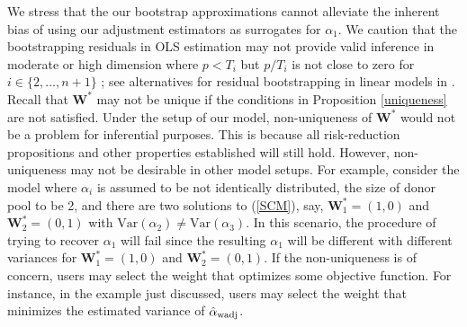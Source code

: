 \documentclass[11pt]{article}
\def\mc#1{\mathcal{#1}} %
\DeclareMathOperator*{\argmax}{arg\,max} %
\def\var#1{\mathrm{Var}(#1)} %
\theoremstyle{definition}
\begin{document}


We stress that the our bootstrap approximations cannot alleviate the inherent bias of using our adjustment estimators as surrogates for $\alpha_1$. We caution that the bootstrapping residuals in OLS estimation may not provide valid inference in moderate or high dimension where $p < T_i$ but $p / T_i$ is not close to zero for $i\in \{2, \ldots, n+1\}$ \citep{el2018can}; see alternatives for residual bootstrapping in linear models in \citet{el2018can}. Recall that $\mathbf{W}^*$  may not be unique if the conditions in Proposition \ref{uniqueness} are not satisfied. Under the setup of our model, non-uniqueness of $\mathbf{W}^*$ would not be a problem for inferential purposes. This is because all risk-reduction propositions and other properties established will still hold. However, non-uniqueness may not be desirable in other model setups. For example, consider the model where $\alpha_i$ is assumed to be not identically distributed, the size of  donor pool to be 2, and there are two solutions to (\ref{SCM}), say, $\mathbf{W}^*_1=(1,0)$ and  $\mathbf{W}^*_2=(0,1)$ with $\var{\alpha_2}\neq \var{\alpha_3}$. In this scenario, the procedure of trying to recover $\alpha_1$ will fail since the resulting $\alpha_1$ will be different with different variances for $\mathbf{W}^*_1=(1,0)$ and  $\mathbf{W}^*_2=(0,1)$. If the non-uniqueness is of concern, users may select the weight that optimizes some objective function. For instance, in the example just discussed, users may select the weight that minimizes the estimated variance of $\hat{\alpha}_{\rm wadj}$.
\end{document}
